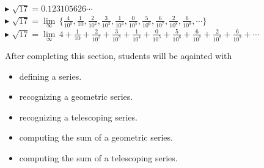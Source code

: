 \documentclass{ximera}
\begin{document}
$\blacktriangleright$  $\sqrt{17} = 0.123105626\cdots$ \\



$\blacktriangleright$ $\sqrt{17} =  \lim\limits_{\infty} \, \{ \frac{4}{10^0}, \frac{1}{10},  \frac{2}{10^2}, \frac{3}{10^3}, \frac{1}{10^4}, \frac{0}{10^5}, \frac{5}{10^6}, \frac{6}{10^7}, \frac{2}{10^8}, \frac{6}{10^9}, \cdots \}$ \\



$\blacktriangleright$ $\sqrt{17} = \lim\limits_{\infty} \, 4 + \frac{1}{10} + \frac{2}{10^2} + \frac{3}{10^3} + \frac{1}{10^4} + \frac{0}{10^5} + \frac{5}{10^6} + \frac{6}{10^7} + \frac{2}{10^8} + \frac{6}{10^9} + \cdots$ \\




















\begin{sectionOutcomes}

After completing this section, students will be aqainted with

\begin{itemize}
\item defining a series.
\item recognizing a geometric series.
\item recognizing a telescoping series.
\item computing the sum of a geometric series.
\item computing the sum of a telescoping series.
\end{itemize}

\end{sectionOutcomes}
\end{document}
